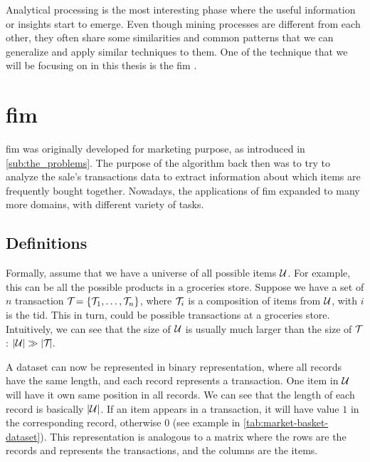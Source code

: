 Analytical processing is the most interesting phase where the useful information or insights start to emerge.
Even though mining processes are different from each other, they often share some similarities and common patterns that we can generalize and apply similar techniques to them.
One of the technique that we will be focusing on in this thesis is the \ac{fim} \citep{borgelt_fim_2012}.

\section{\Acl{fim}}
\Acl{fim} was originally developed for marketing purpose, as introduced in \autoref{sub:the_problems}.
The purpose of the algorithm back then was to try to analyze the sale's transactions data to extract information about which items are frequently bought together.
Nowadays, the applications of \acl{fim} expanded to many more domains, with different variety of tasks.
\subsection{Definitions}
Formally, assume that we have a universe of all possible items $\mathcal{U}$.
For example, this can be all the possible products in a groceries store.
Suppose we have a set of $\mathit{n}$ transaction $\mathcal{T}_{} = \{\mathcal{T}_{1}, \dots, \mathcal{T}_{n}\}{}$, where $\mathcal{T}_{i}$ is a composition of items from $\mathcal{U}$, with $i$ is the \ac{tid}.
This in turn, could be possible transactions at a groceries store.
Intuitively, we can see that the size of $\mathcal{U}$ is usually much larger than the size of $\mathcal{T}_{}$: $|\mathcal{U}| \gg |\mathcal{T}_{} |$.

A dataset can now be represented in binary representation, where all records have the same length, and each record represents a transaction.
One item in $\mathcal{U}$ will have it own same position in all records.
We can see that the length of each record is basically $|\mathcal{U}|$.
If an item appears in a transaction, it will have value $1$ in the corresponding record, otherwise $0$ (see example in \autoref{tab:market-basket-dataset}).
This representation is analogous to a matrix where the rows are the records and represents the transactions, and the columns are the items.

